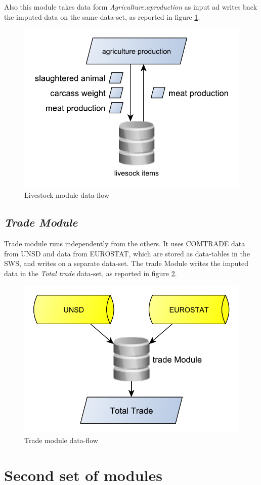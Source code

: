 \documentclass[]{article}
\begin{document}
Also this module takes data form \emph{Agriculture:aproduction} as input
ad writes back the imputed data on the same data-set, as reported in
figure \ref{fig:f7}.

\begin{figure}[H]

{\centering \includegraphics[width=0.5\linewidth]{images/SwsFbs/07_Livestock} 

}

\caption{\label{fig:f7}Livestock module data-flow}\label{fig:f7}
\end{figure}

\subsection{\texorpdfstring{\emph{Trade
Module}}{Trade Module}}\label{trade-module}

Trade module runs independently from the others. It uses COMTRADE data
from UNSD and data from EUROSTAT, which are stored as data-tables in the
SWS, and writes on a separate data-set. The trade Module writes the
imputed data in the \emph{Total trade} data-set, as reported in figure
\ref{fig:f8}.

\begin{figure}[H]

{\centering \includegraphics[width=0.45\linewidth]{images/SwsFbs/08_trade} 

}

\caption{\label{fig:f8}Trade module data-flow}\label{fig:f8}
\end{figure}

\section{Second set of modules}\label{second-set-of-modules}
\end{document}
